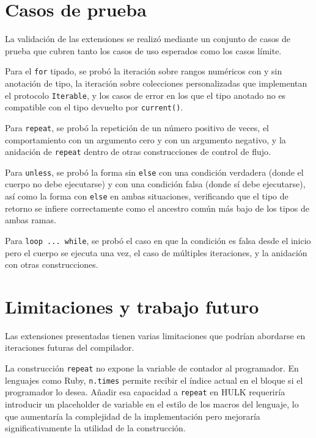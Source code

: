 \documentclass[12pt, a4paper]{article}
\begin{document}
\section{Casos de prueba}

La validación de las extensiones se realizó mediante un conjunto de casos de prueba que cubren tanto los casos de uso esperados como los casos límite.

Para el \texttt{for} tipado, se probó la iteración sobre rangos numéricos con y sin anotación de tipo, la iteración sobre colecciones personalizadas que implementan el protocolo \texttt{Iterable}, y los casos de error en los que el tipo anotado no es compatible con el tipo devuelto por \texttt{current()}.

Para \texttt{repeat}, se probó la repetición de un número positivo de veces, el comportamiento con un argumento cero y con un argumento negativo, y la anidación de \texttt{repeat} dentro de otras construcciones de control de flujo.

Para \texttt{unless}, se probó la forma sin \texttt{else} con una condición verdadera (donde el cuerpo no debe ejecutarse) y con una condición falsa (donde sí debe ejecutarse), así como la forma con \texttt{else} en ambas situaciones, verificando que el tipo de retorno se infiere correctamente como el ancestro común más bajo de los tipos de ambas ramas.

Para \texttt{loop~...~while}, se probó el caso en que la condición es falsa desde el inicio pero el cuerpo se ejecuta una vez, el caso de múltiples iteraciones, y la anidación con otras construcciones.

\section{Limitaciones y trabajo futuro}

Las extensiones presentadas tienen varias limitaciones que podrían abordarse en iteraciones futuras del compilador.

La construcción \texttt{repeat} no expone la variable de contador al programador. En lenguajes como Ruby, \texttt{n.times} permite recibir el índice actual en el bloque si el programador lo desea. Añadir esa capacidad a \texttt{repeat} en HULK requeriría introducir un placeholder de variable en el estilo de los macros del lenguaje, lo que aumentaría la complejidad de la implementación pero mejoraría significativamente la utilidad de la construcción.
\end{document}

